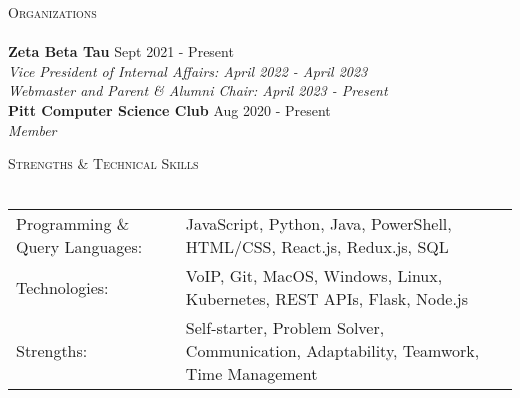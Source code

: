\documentclass[letterpaper]{article}
\newcommand{\lineunder} {
    \vspace*{-8pt} \\
    \hspace*{-18pt} \hrulefill \\
}
\newcommand{\header} [1] {
    {\hspace*{-18pt}\vspace*{6pt} \textsc{#1}}
    \vspace*{-6pt} \lineunder
}
\begin{document}
\header{Organizations}
\textbf{Zeta Beta Tau} \hfill Sept 2021 - Present\\
\textit{Vice President of Internal Affairs: April 2022 - April 2023} \\
\textit{Webmaster and Parent \& Alumni Chair: April 2023 - Present} \\
\vspace{1mm}
\textbf{Pitt Computer Science Club} \hfill Aug 2020 - Present\\
\textit{Member} \\
\vspace{2mm}

\header{Strengths \& Technical Skills}
\begin{tabular}{ l l }
	Programming \& Query Languages: & JavaScript, Python, Java, PowerShell, HTML/CSS, React.js, Redux.js, SQL \\
	Technologies:                   & VoIP, Git, MacOS, Windows, Linux, Kubernetes, REST APIs, Flask, Node.js \\
    Strengths:                      & Self-starter, Problem Solver, Communication, Adaptability, Teamwork, Time Management \\
\end{tabular}
\vspace{2mm}


\
\end{document}
